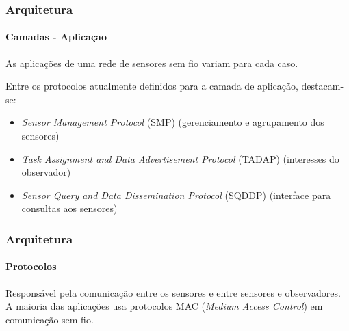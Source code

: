 \documentclass[notes]{beamer}
\begin{document}
\begin{frame}
\frametitle{Arquitetura}
\framesubtitle{Camadas - Aplicaçao}

\begin{block}

As aplicações de uma rede de sensores sem fio variam para cada caso.

\end{block} \pause

\begin{block}

Entre os protocolos atualmente definidos para a camada de aplicação, destacam-se:

\begin{itemize}

\item \textit{Sensor Management Protocol} (SMP) (gerenciamento e agrupamento dos sensores) \pause
\item \textit{Task Assignment and Data Advertisement Protocol}   (TADAP) (interesses do observador) \pause
\item \textit{Sensor Query and Data Dissemination Protocol} (SQDDP) (interface para consultas aos sensores)

\end{itemize}

\end{block}

\end{frame}

\begin{frame}
\frametitle{Arquitetura}
\framesubtitle{Protocolos}

\begin{block}

Responsável pela comunicação entre os sensores e entre sensores e observadores. A maioria das aplicações usa protocolos MAC (\textit{Medium Access Control}) em comunicação sem fio. 

\end{block}

\end{frame}
\end{document}
